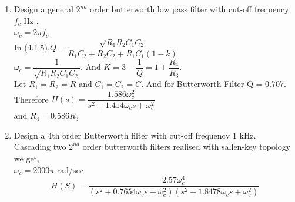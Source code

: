 \documentclass[journal,12pt,twocolumn]{IEEEtran}
\renewcommand\thesection{\arabic{section}}
\begin{document}
\begin{enumerate}[label=\thesection.\arabic*,ref=\thesection.\theenumi]
\vspace{10pt}
\item Design a general $2^{nd}$ order butterworth low pass filter with cut-off frequency $f_{c}$ Hz  .\\
\solution $\omega_{c} = 2\pi f_{c}$\\
In (4.1.5),$Q = \dfrac{\sqrt{R_{1}R_{2}C_{1}C_{2}}}{R_{1}C_{2}+R_{2}C_{2}+R_{1}C_{1}(1-k)}$\\
$\omega_{c} = \dfrac{1}{\sqrt{R_{1}R_{2}C_{1}C_{2}}}$. And $K = 3-\dfrac{1}{Q}=1+\dfrac{R_{4}}{R_{3}}$.\\Let $R_{1}=R_{2}=R$ and $C_{1}=C_{2}=C$. And for Butterworth Filter Q = 0.707.\\
Therefore $H(s) = \dfrac{1.586\omega_{c}^{2}}{s^{2}+ 1.414\omega_{c}s+\omega_{c}^{2}}$\\
and $R_{4} = 0.586R_{3}$
\vspace{10pt}
\item Design a 4th order Butterworth filter with cut-off frequency 1 kHz.\\
\solution 
Cascading two $2^{nd}$ order butterworth filters realised with sallen-key topology\\we get,\\
$\omega_{c} = 2000\pi $ rad/sec
$$H(S) = \frac{2.57\omega_{c}^{4}}{(s^{2} + 0.7654\omega_{c}s + \omega_{c}^{2})(s^{2} + 1.8478\omega_{c}s + \omega_{c}^{2})}$$
\end{enumerate}
\end{document}
